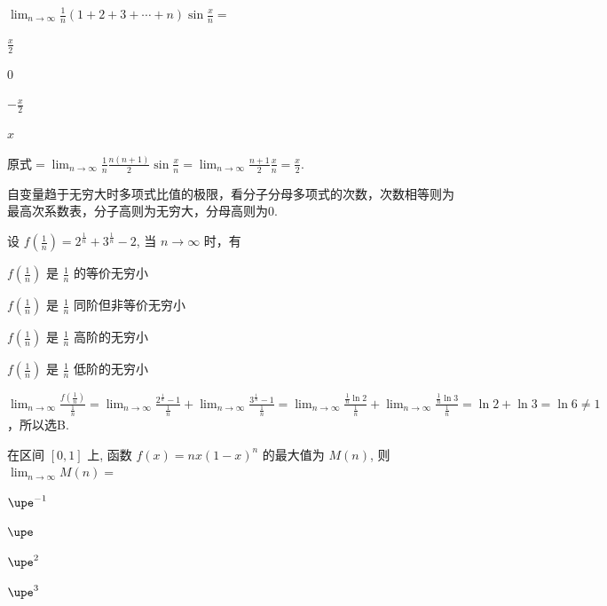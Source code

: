 \documentclass{CWNUExam}
\begin{document}
\begin{problem}
  $\lim _{n \to \infty} \frac{1}{n}\left( 1+2+3+\cdots+n \right) \sin \frac{x}{n}=$
  \paren[A]
  \begin{choices}
    \item $\frac{x}{2}$
    \item $0$
    \item $-\frac{x}{2}$
    \item $x$
  \end{choices}
\end{problem}

\begin{analysis}
  原式$=\lim _{n \to \infty} \frac{1}{n} \frac{n(n+1)}{2} \sin \frac{x}{n} = \lim _{n \to \infty} \frac{n+1}{2} \frac{x}{n} = \frac{x}{2}$.

  \faMortarBoard 自变量趋于无穷大时多项式比值的极限，看分子分母多项式的次数，次数相等则为最高次系数表，分子高则为无穷大，分母高则为0.
\end{analysis}

\begin{problem}
  设 $f\left(\tfrac{1}{n}\right)=2^{\frac{1}{n}}+3^{\frac{1}{n}}-2$, 当 $n \to \infty$ 时，有
  \paren[B]
  \begin{choices}
    \item $f\left(\tfrac{1}{n}\right)$ 是 $\tfrac{1}{n}$ 的等价无穷小
    \item $f\left(\tfrac{1}{n}\right)$ 是 $\tfrac{1}{n}$ 同阶但非等价无穷小
    \item $f\left(\tfrac{1}{n}\right)$ 是 $\tfrac{1}{n}$ 高阶的无穷小
    \item $f\left(\tfrac{1}{n}\right)$ 是 $\tfrac{1}{n}$ 低阶的无穷小
  \end{choices}
\end{problem}

\begin{analysis}
  $\lim _{n \to \infty} \frac{f(\frac{1}{n})}{\frac{1}{n}} = \lim _{n \to \infty} \frac{2^{\frac{1}{n}}-1}{\frac{1}{n}} + \lim _{n \to \infty} \frac{3^{\frac{1}{n}}-1}{\frac{1}{n}} = \lim _{n \to \infty} \frac{\frac{1}{n} \ln2}{\frac{1}{n}} + \lim _{n \to \infty} \frac{\frac{1}{n}\ln 3}{\frac{1}{n}} = \ln2+\ln3 = \ln 6 \ne 1$，所以选B.
\end{analysis}

\begin{problem}
  在区间 $[0, 1]$ 上, 函数 $f(x)=n x(1-x)^{n}$ 的最大值为 $M(n)$, 则 $\lim _{n \to \infty} M(n)=$

  \paren[A]
  \begin{choices}
    \item $\upe^{-1}$
    \item $\upe$
    \item $\upe^{2}$
    \item $\upe^{3}$
  \end{choices}
\end{problem}
\end{document}

